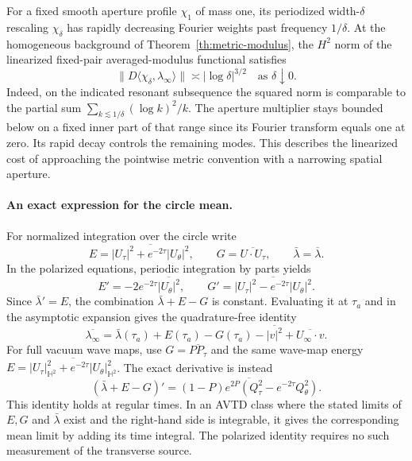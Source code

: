 For a fixed smooth aperture profile $\chi_1$ of mass
one, its periodized width-$\delta$ rescaling
$\chi_\delta$ has rapidly decreasing Fourier
weights past frequency $1/\delta$.
At the homogeneous background of
Theorem~\ref{th:metric-modulus}, the $H^2$ norm of the
linearized fixed-pair averaged-modulus functional
satisfies
\[
 \|D\langle\chi_\delta,\lambda_\infty\rangle\|
      \asymp |\log\delta|^{3/2}
      \quad\text{as }\delta\downarrow0 .
\]
Indeed, on the indicated resonant subsequence the
squared norm is comparable to the partial sum
$\sum_{k\lesssim1/\delta}(\log k)^2/k$.
The aperture multiplier stays bounded below on a
fixed inner part of that range since its Fourier
transform equals one at zero. Its rapid decay
controls the remaining modes. This describes the
linearized cost of approaching the pointwise
metric convention with a narrowing spatial aperture.

\paragraph{An exact expression for the circle mean.}
For normalized integration over the circle write
\[
 E=\overline{|U_\tau|^2+e^{-2\tau}|U_\theta|^2},
 \qquad G=\overline{U\cdot U_\tau},
 \qquad \bar\lambda=\overline{\lambda}.
\]
In the polarized equations, periodic integration by parts yields
\[
 E'=-2e^{-2\tau}\overline{|U_\theta|^2},\qquad
 G'=\overline{|U_\tau|^2-e^{-2\tau}|U_\theta|^2}.
\]
Since $\bar\lambda'=E$, the combination
$\bar\lambda+E-G$ is constant. Evaluating it at
$\tau_a$ and in the asymptotic expansion gives the
quadrature-free identity
\begin{equation}
 \overline{\lambda_\infty}
 =\bar\lambda(\tau_a)+E(\tau_a)-G(\tau_a)
       -\overline{|v|^2}+\overline{U_\infty\cdot v}.
 \label{eq:mean-modulus-virial}
\end{equation}
For full vacuum wave maps, use
$G=\overline{P P_\tau}$ and the same wave-map energy
$E=\overline{|U_\tau|_{\mathbb H^2}^2+
                 e^{-2\tau}|U_\theta|_{\mathbb H^2}^2}$.
The exact derivative is instead
\[
 (\bar\lambda+E-G)'=
 \overline{(1-P)e^{2P}(Q_\tau^2-e^{-2\tau}Q_\theta^2)} .
\]
This identity holds at regular times. In an AVTD class
where the stated limits of $E,G$ and $\bar\lambda$ exist
and the right-hand side is integrable, it gives the
corresponding mean limit by adding its time integral.
The polarized identity requires no such measurement of
the transverse source.
